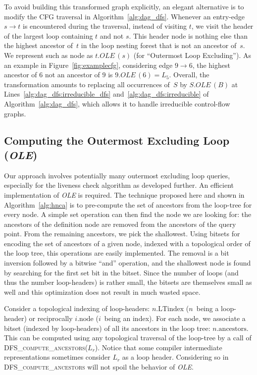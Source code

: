 \newcommand{\OLE}[2]{#1.\textit{OLE}\,(#2)}

To avoid building this transformed graph explicitly, an elegant alternative is to modify the CFG traversal in Algorithm~\ref{alg:dag_dfs}.
Whenever an entry-edge $s\rightarrow t$ is encountered during the traversal, instead of visiting $t$, we visit the header of the largest loop containing $t$ and not $s$.
This header node is nothing else than the highest ancestor of~$t$ in the loop nesting forest that is not an ancestor of~$s$.
We represent such as node as $\OLE{t}{s}$ (for ``Outermost Loop Excluding'').
As an example in Figure~\ref{fig:examplecfg},
considering edge $9\rightarrow 6$, the highest ancestor of $6$ not an ancestor of $9$ is $\OLE{9}{6}=L_5$. 
Overall, the transformation amounts to replacing all occurrences of~$S$ by $\OLE{S}{B}$ at Lines~\ref{alg:dag_dfs:irreducible_dfs} and~\ref{alg:dag_dfs:irreducible} of Algorithm~\ref{alg:dag_dfs}, which allows it to handle irreducible control-flow graphs.


\newcommand{\couple}[2]{\langle#1,#2\rangle}
\def\sep{,$ $}

\subsection{Computing the Outermost Excluding Loop (\textit{OLE})}
\label{sec:ole}
Our approach involves potentially many outermost excluding loop queries, especially for the liveness check algorithm as developed further.
An efficient implementation of \textit{OLE} is required.
The technique proposed here and shown in Algorithm~\ref{alg:hnca} is to pre-compute the set of ancestors from the loop-tree for every node.
A simple set operation can then find the node we are looking for:
the ancestors of the definition node are removed from the ancestors of the query point.
From the remaining ancestors, we pick the shallowest.
Using bitsets for encoding the set of ancestors of a given node, indexed with a topological order of the loop tree, this operations are easily implemented.
The removal is a bit inversion followed by a bitwise ``and'' operation, and the shallowest node is found by searching for the first set bit in the bitset.
Since the number of loops (and thus the number loop-headers) is rather small, the bitsets are themselves small as well and this optimization does not result in much wasted space.

Consider a topological indexing of loop-headers: $n.\textrm{LTindex}$ ($n$~being a loop-header) or reciprocally $i.\textrm{node}$ ($i$~being an index).
For each node, we associate a bitset (indexed by loop-headers) of all its ancestors in the loop tree:
$n.\textrm{ancestors}$.
This can be computed using any topological traversal of the loop-tree by a call of \textsc{DFS\_compute\_ancestors}($L_r$).
Notice that some compiler intermediate representations sometimes consider $L_r$ as a loop header.
Considering so in \textsc{DFS\_compute\_ancestors} will not spoil the behavior of \@\textit{OLE}.

